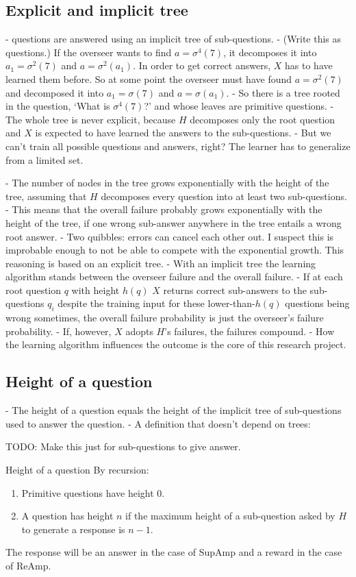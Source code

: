 \documentclass{farlamp}
\begin{document}
\subsection{Explicit and implicit tree}

- questions are answered using an implicit tree of sub-questions.
- (Write this as questions.) If the overseer wants to find $a = \sigma^4(7)$, it
decomposes it into $a_1 = \sigma^2(7)$ and $a = \sigma^2(a_1)$. In order to get
correct answers, $X$ has
to have learned them before. So at some point the overseer must have found $a =
\sigma^2(7)$ and decomposed it into $a_1 = \sigma(7)$ and $a = \sigma(a_1)$.
- So there is a tree rooted in the question, ‘What is $\sigma^4(7)$?’ and whose
leaves are primitive questions.
- The whole tree is never explicit, because $H$ decomposes only the root
question and $X$ is expected to have learned the answers to the sub-questions.
- But we can't train all possible questions and answers, right? The learner has
to generalize from a limited set.

- The number of nodes in the tree grows exponentially with the height of the
tree, assuming that $H$ decomposes every question into at least two
sub-questions.
- This means that the overall failure probably grows exponentially with the
height of the tree, if one wrong sub-answer anywhere in the tree entails a wrong
root answer.
- Two quibbles: errors can cancel each other out. I suspect this is improbable
enough to not be able to compete with the exponential growth. This reasoning is
based on an explicit tree.
- With an implicit tree the learning algorithm stands between the overseer
failure and the overall failure.
- If at each root question $q$ with height $h(q)$ $X$ returns correct
sub-answers to the sub-questions $q_i$ despite the training input for these
lower-than-$h(q)$ questions being wrong sometimes, the overall failure
probability is just the overseer's failure probability.
- If, however, $X$ adopts $H$'s failures, the failures compound.
- How the learning algorithm influences the outcome is the core of this research
project.


\subsection{Height of a question}

- The height of a question equals the height of the implicit tree of
sub-questions used to answer the question.
- A definition that doesn't depend on trees:

TODO: Make this just for sub-questions to give answer.
\begin{definition}{Height of a question} By recursion:
    \begin{enumerate}
    \item Primitive questions have height 0.
    \item A question has height $n$ if the maximum height of a sub-question
        asked by $H$ to generate a response is $n-1$.
    \end{enumerate}
The response will be an answer in the case of SupAmp and a reward in the case of
ReAmp.
\end{definition}
\end{document}
